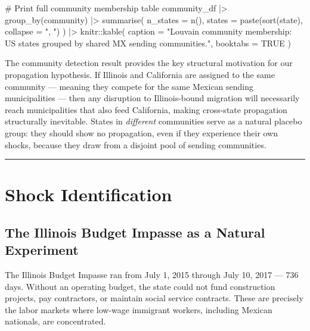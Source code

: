 \documentclass[
  11pt,
  letterpaper,
  DIV=11,
  numbers=noendperiod]{scrartcl}
\newenvironment{Shaded}{}{}
\newcommand{\AttributeTok}[1]{\textcolor[rgb]{0.84,0.23,0.29}{#1}}
\newcommand{\CommentTok}[1]{\textcolor[rgb]{0.42,0.45,0.49}{#1}}
\newcommand{\ConstantTok}[1]{\textcolor[rgb]{0.00,0.36,0.77}{#1}}
\newcommand{\FunctionTok}[1]{\textcolor[rgb]{0.44,0.26,0.76}{#1}}
\newcommand{\NormalTok}[1]{\textcolor[rgb]{0.14,0.16,0.18}{#1}}
\newcommand{\SpecialCharTok}[1]{\textcolor[rgb]{0.00,0.36,0.77}{#1}}
\newcommand{\StringTok}[1]{\textcolor[rgb]{0.01,0.18,0.38}{#1}}
\begin{document}
\begin{Shaded}
\begin{Highlighting}[]
\CommentTok{\# Print full community membership table}
\NormalTok{community\_df }\SpecialCharTok{|\textgreater{}}
  \FunctionTok{group\_by}\NormalTok{(community) }\SpecialCharTok{|\textgreater{}}
  \FunctionTok{summarise}\NormalTok{(}
    \AttributeTok{n\_states =} \FunctionTok{n}\NormalTok{(),}
    \AttributeTok{states   =} \FunctionTok{paste}\NormalTok{(}\FunctionTok{sort}\NormalTok{(state), }\AttributeTok{collapse =} \StringTok{", "}\NormalTok{)}
\NormalTok{  ) }\SpecialCharTok{|\textgreater{}}
\NormalTok{  knitr}\SpecialCharTok{::}\FunctionTok{kable}\NormalTok{(}
    \AttributeTok{caption =} \StringTok{"Louvain community membership: US states grouped by shared MX sending communities."}\NormalTok{,}
    \AttributeTok{booktabs =} \ConstantTok{TRUE}
\NormalTok{  )}
\end{Highlighting}
\end{Shaded}

The community detection result provides the key structural motivation
for our propagation hypothesis. If Illinois and California are assigned
to the same community --- meaning they compete for the same Mexican
sending municipalities --- then any disruption to Illinois-bound
migration will necessarily reach municipalities that also feed
California, making cross-state propagation structurally inevitable.
States in \emph{different} communities serve as a natural placebo group:
they should show no propagation, even if they experience their own
shocks, because they draw from a disjoint pool of sending communities.

\begin{center}\rule{0.5\linewidth}{0.5pt}\end{center}

\section{Shock Identification}\label{shock-identification}

\subsection{The Illinois Budget Impasse as a Natural
Experiment}\label{the-illinois-budget-impasse-as-a-natural-experiment}

The Illinois Budget Impasse ran from July 1, 2015 through July 10, 2017
--- 736 days. Without an operating budget, the state could not fund
construction projects, pay contractors, or maintain social service
contracts. These are precisely the labor markets where low-wage
immigrant workers, including Mexican nationals, are concentrated.
\end{document}
